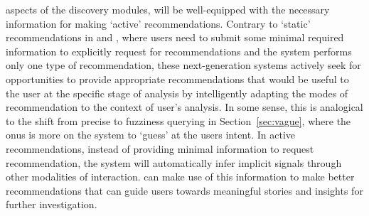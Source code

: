 aspects of the \vidaql discovery modules, 
\vida will be well-equipped with the necessary 
information for making `active' recommendations. 
Contrary to `static' recommendations in \sbd and \seedb, 
where users need to submit some minimal required 
information to explicitly request 
for recommendations and the system 
performs only one type of recommendation, 
these next-generation systems 
actively seek for opportunities to 
provide appropriate recommendations 
that would be useful to the user at the 
specific stage of analysis by intelligently 
adapting the modes of recommendation 
to the context of user's analysis. 
In some sense, this is analogical to the shift 
from precise to fuzziness querying in Section~\ref{sec:vague}, where the onus is more on the system to `guess' at the users intent. 
In active recommendations, instead of providing 
minimal information to request recommendation, 
the system will automatically infer implicit 
signals through other modalities of interaction. 
\vida can make use of this information to 
make better recommendations that can guide users 
towards meaningful stories and insights for further investigation.



